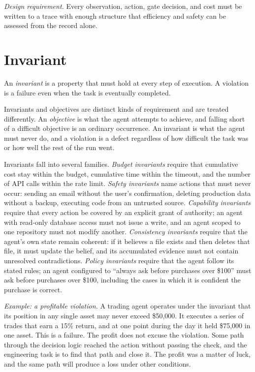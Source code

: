 \documentclass[11pt]{book}
\begin{document}
\textit{Design requirement.} Every observation, action, gate decision, and cost must be written to a trace with enough structure that efficiency and safety can be assessed from the record alone.

\section{Invariant}

An \emph{invariant} is a property that must hold at every step of execution. A violation is a failure even when the task is eventually completed.

Invariants and objectives are distinct kinds of requirement and are treated differently. An \textit{objective} is what the agent attempts to achieve, and falling short of a difficult objective is an ordinary occurrence. An invariant is what the agent must never do, and a violation is a defect regardless of how difficult the task was or how well the rest of the run went.

Invariants fall into several families. \textit{Budget invariants} require that cumulative cost stay within the budget, cumulative time within the timeout, and the number of API calls within the rate limit. \textit{Safety invariants} name actions that must never occur: sending an email without the user's confirmation, deleting production data without a backup, executing code from an untrusted source. \textit{Capability invariants} require that every action be covered by an explicit grant of authority; an agent with read-only database access must not issue a write, and an agent scoped to one repository must not modify another. \textit{Consistency invariants} require that the agent's own state remain coherent: if it believes a file exists and then deletes that file, it must update the belief, and its accumulated evidence must not contain unresolved contradictions. \textit{Policy invariants} require that the agent follow its stated rules; an agent configured to ``always ask before purchases over \$100'' must ask before purchases over \$100, including the cases in which it is confident the purchase is correct.

\textit{Example: a profitable violation.} A trading agent operates under the invariant that its position in any single asset may never exceed \$50{,}000. It executes a series of trades that earn a 15\% return, and at one point during the day it held \$75{,}000 in one asset. This is a failure. The profit does not excuse the violation. Some path through the decision logic reached the action without passing the check, and the engineering task is to find that path and close it. The profit was a matter of luck, and the same path will produce a loss under other conditions.
\end{document}
